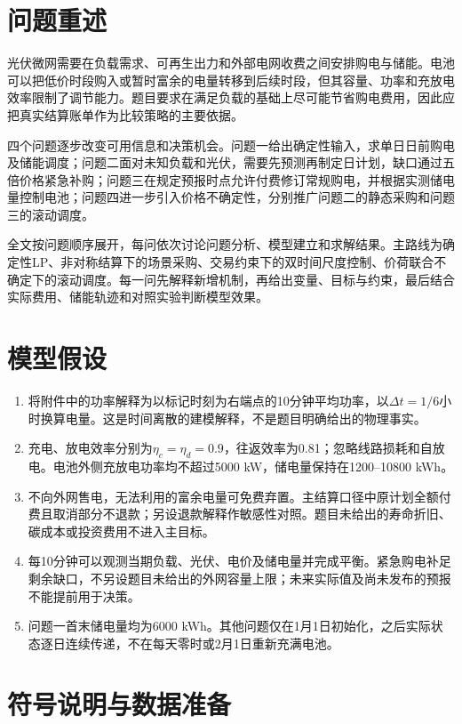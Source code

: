 \section{问题重述}

光伏微网需要在负载需求、可再生出力和外部电网收费之间安排购电与储能。电池可以把低价时段购入或暂时富余的电量转移到后续时段，但其容量、功率和充放电效率限制了调节能力。题目要求在满足负载的基础上尽可能节省购电费用，因此应把真实结算账单作为比较策略的主要依据。

四个问题逐步改变可用信息和决策机会。问题一给出确定性输入，求单日日前购电及储能调度；问题二面对未知负载和光伏，需要先预测再制定日计划，缺口通过五倍价格紧急补购；问题三在规定预报时点允许付费修订常规购电，并根据实测储电量控制电池；问题四进一步引入价格不确定性，分别推广问题二的静态采购和问题三的滚动调度。

全文按问题顺序展开，每问依次讨论问题分析、模型建立和求解结果。主路线为确定性LP、非对称结算下的场景采购、交易约束下的双时间尺度控制、价荷联合不确定下的滚动调度。每一问先解释新增机制，再给出变量、目标与约束，最后结合实际费用、储能轨迹和对照实验判断模型效果。

\section{模型假设}

\begin{enumerate}
 \item 将附件中的功率解释为以标记时刻为右端点的10分钟平均功率，以$\Delta t=1/6$小时换算电量。这是时间离散的建模解释，不是题目明确给出的物理事实。
 \item 充电、放电效率分别为$\eta_c=\eta_d=0.9$，往返效率为0.81；忽略线路损耗和自放电。电池外侧充放电功率均不超过5000 kW，储电量保持在1200--10800 kWh。
 \item 不向外网售电，无法利用的富余电量可免费弃置。主结算口径中原计划全额付费且取消部分不退款；另设退款解释作敏感性对照。题目未给出的寿命折旧、碳成本或投资费用不进入主目标。
 \item 每10分钟可以观测当期负载、光伏、电价及储电量并完成平衡。紧急购电补足剩余缺口，不另设题目未给出的外网容量上限；未来实际值及尚未发布的预报不能提前用于决策。
 \item 问题一首末储电量均为6000 kWh。其他问题仅在1月1日初始化，之后实际状态逐日连续传递，不在每天零时或2月1日重新充满电池。
\end{enumerate}

\section{符号说明与数据准备}

